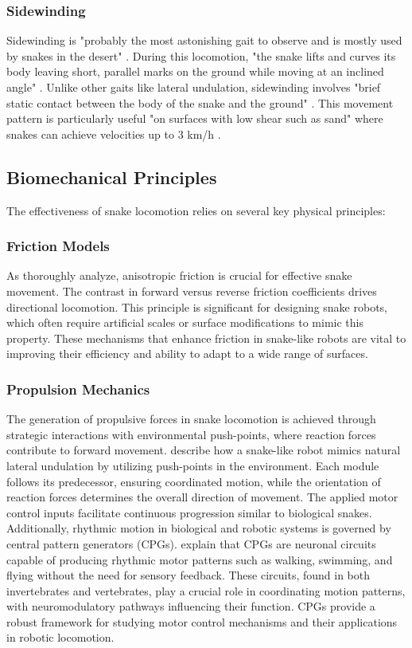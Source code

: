 \documentclass[12pt,a4paper]{report}
\begin{document}
\subsubsection{Sidewinding}
Sidewinding is "probably the most astonishing gait to observe and is mostly used by snakes in the desert" \textcite{transeth-2009}. During this locomotion, "the snake lifts and curves its body leaving short, parallel marks on the ground while moving at an inclined angle" \textcite{transeth-2009}. Unlike other gaits like lateral undulation, sidewinding involves "brief static contact between the body of the snake and the ground" \textcite{transeth-2009}. This movement pattern is particularly useful "on surfaces with low shear such as sand" where snakes can achieve velocities up to 3 km/h \textcite{transeth-2009}.

\subsection{Biomechanical Principles}
The effectiveness of snake locomotion relies on several key physical principles:

\subsubsection{Friction Models}
As \textcite{lamping-2022} thoroughly analyze, anisotropic friction is crucial for effective snake movement. The contrast in forward versus reverse friction coefficients drives directional locomotion. This principle is significant for designing snake robots, which often require artificial scales or surface modifications to mimic this property. These mechanisms that enhance friction in snake-like robots are vital to improving their efficiency and ability to adapt to a wide range of surfaces.

\subsubsection{Propulsion Mechanics}
The generation of propulsive forces in snake locomotion is achieved through strategic interactions with environmental push-points, where reaction forces contribute to forward movement.\textcite{Bayraktaroglu2006} describe how a snake-like robot mimics natural lateral undulation by utilizing push-points in the environment. Each module follows its predecessor, ensuring coordinated motion, while the orientation of reaction forces determines the overall direction of movement. The applied motor control inputs facilitate continuous progression similar to biological snakes.
Additionally, rhythmic motion in biological and robotic systems is governed by central pattern generators (CPGs).\textcite{MARDER2001R986} explain that CPGs are neuronal circuits capable of producing rhythmic motor patterns such as walking, swimming, and flying without the need for sensory feedback. These circuits, found in both invertebrates and vertebrates, play a crucial role in coordinating motion patterns, with neuromodulatory pathways influencing their function. CPGs provide a robust framework for studying motor control mechanisms and their applications in robotic locomotion.
\end{document}
